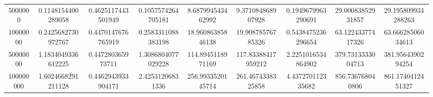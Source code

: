 \begin{table}[ht]
{\begin{tabular}{@{}S[table-format=9]SSSSSSSS@{}}
            5000000             & 0.1148154400289058  & 0.4625117443501949 & 0.1057574264705181 & 8.687994543462992  & 9.371084868907928  & 0.1949679963290691 & 29.00083852931857  & 29.195809934288263 \\
            10000000            & 0.2425682730972767  & 0.4470147676765919 & 0.2583311088383198 & 18.96086385846138  & 19.90878576785326  & 0.5438475236296654 & 63.12243377417326  & 63.66628506034613  \\
            50000000            & 1.1834049336612225  & 0.447280365973711  & 1.3086804077029228 & 114.8945118971169  & 117.83388417959212 & 2.2251016534864902 & 379.7313333004713  & 381.9564390294254  \\
            100000000           & 1.6024668291211128  & 0.4462943933904171 & 2.42531206831336   & 256.9933520145714  & 261.4674338325858  & 4.437270112335682  & 856.736768040806   & 861.1740412451327  \\
            \bottomrule
        \end{tabular}\label{table:efficiency_parquet-70percent_small-tables}
    }
\end{table}